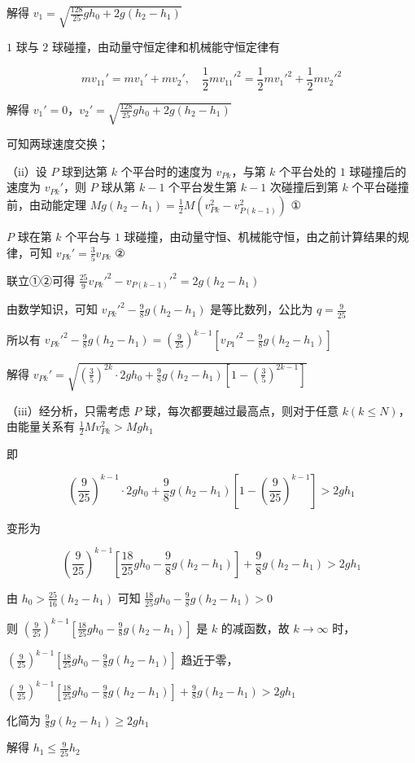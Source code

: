 \documentclass[\gkver]{gaokaozhenti}
\begin{document}
\begin{enumerate}
{解得 $ v_{1}=\sqrt{\frac{128}{25}gh_{0}+2g(h_{2}-h_{1})} $

$ 1 $ 球与 $ 2 $ 球碰撞，由动量守恒定律和机械能守恒定律有

\[ mv_{11}'=mv_{1}'+mv_{2}',\quad \frac{1}{2}mv_{11}'^{2}=\frac{1}{2}mv_{1}'^{2}+\frac{1}{2}mv_{2}'^{2} \]

解得 $ v_{1}'=0 $，$ v_{2}'=\sqrt{\frac{128}{25}gh_{0}+2g(h_{2}-h_{1})} $

可知两球速度交换；

（ii）设 $ P $ 球到达第 $ k $ 个平台时的速度为 $ v_{Pk} $，与第 $ k $ 个平台处的 $ 1 $ 球碰撞后的速度为 $ v_{Pk}' $，则 $ P $ 球从第 $ k-1 $ 个平台发生第 $ k-1 $ 次碰撞后到第 $ k $ 个平台碰撞前，由动能定理 $ Mg\left(h_{2}-h_{1}\right)=\frac{1}{2}M\left(v_{Pk}^{2}-v_{P(k-1)}^{2}\right) $ ①

$ P $ 球在第 $ k $ 个平台与 $ 1 $ 球碰撞，由动量守恒、机械能守恒，由之前计算结果的规律，可知 $ v_{Pk}' = \frac{3}{5} v_{Pk} $ ②

联立①②可得 $ \frac{25}{9}v_{Pk}'^{2}-v_{P(k-1)}'^{2}=2g\left(h_{2}-h_{1}\right) $

由数学知识，可知 $ v_{Pk}'^{2}-\frac{9}{8}g\left(h_{2}-h_{1}\right) $ 是等比数列，公比为 $ q=\frac{9}{25} $

所以有 $ v_{Pk}'^{2}-\frac{9}{8}g\left(h_{2}-h_{1}\right)=\left(\frac{9}{25}\right)^{k-1}\left[v_{P1}'^{2}-\frac{9}{8}g\left(h_{2}-h_{1}\right)\right] $

解得 $ v_{Pk}' = \sqrt{\left(\frac{3}{5}\right)^{2k} \cdot 2gh_{0} + \frac{9}{8} g(h_{2} - h_{1}) \left[ 1 - \left(\frac{3}{5}\right)^{2k-1} \right]} $

（iii）经分析，只需考虑 $ P $ 球，每次都要越过最高点，则对于任意 $ k (k \leq N) $，由能量关系有 $ \frac{1}{2} M v_{Pk}^{2} > Mgh_{1} $

即

\[ \left(\frac{9}{25}\right)^{k-1}\cdot 2gh_{0}+\frac{9}{8}g\left(h_{2}-h_{1}\right)\left[1-\left(\frac{9}{25}\right)^{k-1}\right]>2gh_{1} \]

变形为

\[ \left(\frac{9}{25}\right)^{k-1}\left[\frac{18}{25}gh_{0}-\frac{9}{8}g\left(h_{2}-h_{1}\right)\right]+\frac{9}{8}g\left(h_{2}-h_{1}\right)>2gh_{1} \]

由 $ h_{0} > \frac{25}{16}(h_{2} - h_{1}) $ 可知 $ \frac{18}{25}gh_{0} - \frac{9}{8}g(h_{2} - h_{1}) > 0 $

则 $ \left(\frac{9}{25}\right)^{k-1}\left[\frac{18}{25}gh_{0}-\frac{9}{8}g\left(h_{2}-h_{1}\right)\right] $ 是 $ k $ 的减函数，故 $ k\to\infty $ 时，

$ \left(\frac{9}{25}\right)^{k-1}\left[\frac{18}{25}gh_{0}-\frac{9}{8}g\left(h_{2}-h_{1}\right)\right] $ 趋近于零，

$ \left(\frac{9}{25}\right)^{k-1}\left[\frac{18}{25}gh_{0}-\frac{9}{8}g\left(h_{2}-h_{1}\right)\right]+\frac{9}{8}g\left(h_{2}-h_{1}\right)>2gh_{1} $

化简为 $ \frac{9}{8}g\left(h_{2}-h_{1}\right)\geq 2gh_{1} $

解得 $ h_{1} \leq \frac{9}{25} h_{2} $
}
\end{enumerate}
\end{document}
